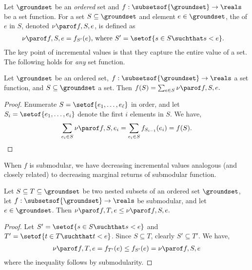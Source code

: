 \documentclass[oneside,letterpaper]{scrartcl} \usepackage{macros}
\begin{document}
Let $\groundset$ be an \emph{ordered} set and $f:
\subsetsof{\groundset} \to \reals$ be a set function.  For a set $S
\subseteq \groundset$ and element $e \in \groundset$, the
 of $e$ in $S$, denoted
$\incvalueof{f}{S}{e}$, is defined as
\begin{align*}
  \incvalueof{f}{S}{e} &= f_{S'}(e) \text{, where } S' = \setof{s \in
    S \suchthat s < e}.
\end{align*}
The key point of incremental values is that they capture the entire
value of a set. The following holds for \emph{any} set function.
\begin{lemma}Let $\groundset$ be an ordered set, $f: \subsetsof{\groundset} \to
  \reals$ a set function, and $S \subseteq \groundset$ a set. Then
  \begin{math}
    f(S) = \sum_{e \in S} \incvalueof{f}{S}{e}.
  \end{math}
  \begin{proof}
    Enumerate $S = \setof{e_1,\dots,e_\ell}$ in order, and let $S_i =
    \setof{e_1,\dots,e_i}$ denote the first $i$ elements in $S$. We
    have,
    \begin{align*}
      \sum_{e_i \in S} \incvalueof{f}{S}{e_i} = \sum_{e_i \in S} f_{S_{i-1}}(e_i) = f(S). \end{align*}
  \end{proof}
\end{lemma}
When $f$ is submodular, we have decreasing incremental values
analogous (and closely related) to decreasing marginal returns of
submodular function.
\begin{lemma}
  Let $S \subseteq T \subseteq \groundset$ be two nested subsets of an
  ordered set $\groundset$, let $f: \subsetsof{\groundset} \to \reals$
  be submodular, and let $e \in \groundset$. Then
  \begin{math}
    \incvalueof{f}{T}{e} \leq \incvalueof{f}{S}{e}.
  \end{math}
  \begin{proof}
    Let $S' = \setof{s \in S \suchthat s < e}$ and $T' = \setof{t \in
      T \suchthat t < e}$. Since $S \subseteq T$, clearly $S'
    \subseteq T'$. We have,
    \begin{align*}
      \incvalueof{f}{T}{e} = f_{T'}(e) \leq f_{S'}(e) =
      \incvalueof{f}{S}{e}
    \end{align*}
    where the inequality follows by submodularity.
  \end{proof}
\end{lemma}
\end{document}

